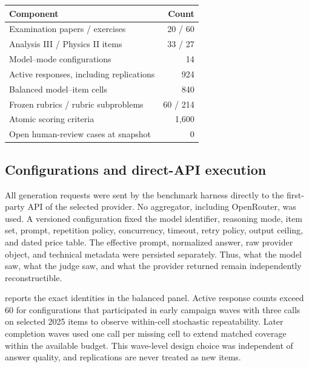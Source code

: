 \documentclass[11pt,a4paper,twocolumn]{article}
\begin{document}
\begin{center}
\begin{minipage}{\columnwidth}
\centering
{}
\label{tab:population}
\footnotesize
\setlength{\tabcolsep}{3.1pt}
\renewcommand{\arraystretch}{1.04}
\begin{tabularx}{\columnwidth}{Y r}
\toprule
\textbf{Component} & \textbf{Count} \\
\midrule
Examination papers / exercises & 20 / 60 \\
Analysis III / Physics II items & 33 / 27 \\
Model--mode configurations & 14 \\
Active responses, including replications & 924 \\
Balanced model--item cells & 840 \\
Frozen rubrics / rubric subproblems & 60 / 214 \\
Atomic scoring criteria & 1,600 \\
Open human-review cases at snapshot & 0 \\
\bottomrule
\end{tabularx}
\end{minipage}
\end{center}

\subsection{Configurations and direct-API execution}

All generation requests were sent by the benchmark harness directly to the
first-party API of the selected provider. No aggregator, including OpenRouter,
was used. A versioned configuration fixed the model identifier, reasoning
mode, item set, prompt, repetition policy, concurrency, timeout, retry policy,
output ceiling, and dated price table. The effective prompt, normalized answer,
raw provider object, and technical metadata were persisted separately. Thus,
what the model saw, what the judge saw, and what the provider returned remain
independently reconstructible.

 reports the exact identities in the balanced panel. Active
response counts exceed 60 for configurations that participated in early
campaign waves with three calls on selected 2025 items to observe within-cell
stochastic repeatability. Later completion waves used one call per missing cell
to extend matched coverage within the available budget. This wave-level design
choice was independent of answer quality, and replications are never treated as
new items.
\end{document}
